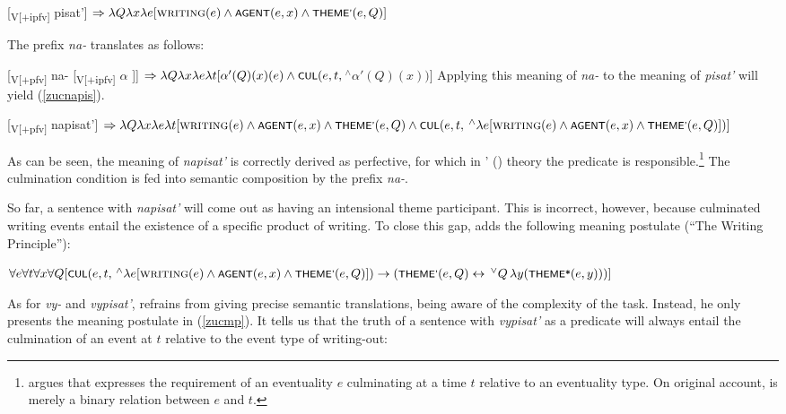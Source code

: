 \documentclass[output=paper,colorlinks,citecolor=brown]{langscibook}
\begin{document}
\ea
\label{zucpis} 
[\textsubscript{V[$+$ipfv]} pisat'] $\Rightarrow \lambda Q \lambda x \lambda e [\textsc{writing}(e) \wedge \cnst{agent}(e,x) \wedge \cnst{theme'}(e,Q)]$
\z

\noindent The prefix \textit{na-} translates as follows:

\ea
\label{zucna} 
[\textsubscript{V[$+$pfv]} na- [\textsubscript{V[$+$ipfv]} $\alpha$ ]] 
$\Rightarrow \lambda Q \lambda x \lambda e \lambda t [\alpha'(Q)(x)(e) \wedge \cnst{Cul}(e,t,{}$$^\wedge \alpha'(Q)(x))]$
\z
Applying this meaning of \textit{na-} to the meaning of \textit{pisat'} will yield (\ref{zucnapis}).

\ea
\label{zucnapis} 
[\textsubscript{V[$+$pfv]} napisat'] $\Rightarrow \lambda Q \lambda x \lambda e \lambda t [\textsc{writing}(e) \wedge \cnst{agent}(e,x) \wedge \cnst{theme'}(e,Q) \wedge \cnst{Cul}(e,t,{}$$^\wedge \lambda e [\textsc{writing} (e) \wedge \cnst{agent}(e,x) \wedge \cnst{theme'}(e,Q)])]$
\z

\noindent As can be seen, the meaning of \textit{napisat'} is correctly derived as perfective, for which in \citeauthor{Parsons1990}' (\citeyear{Parsons1990}) theory the predicate  is responsible.\footnote{\citet{Zucchi1999} argues that  expresses the requirement of an eventuality $e$ culminating at a time $t$ relative to an eventuality type. On  original account,  is merely a binary relation between $e$ and $t$.} The culmination condition is fed into semantic composition by the prefix \textit{na-}.  

So far, a sentence with \textit{napisat'} will come out as having an intensional theme participant. This is incorrect, however,  
because culminated writing events entail the existence of a specific product of writing. To close this gap, \citet{Zucchi1999} adds the following meaning postulate (``The Writing Principle''): 

\ea
\label{zucwp} 
$\forall e \forall t \forall x \forall Q [\cnst{Cul}(e,t, \,^\wedge \lambda e [\textsc{writing} (e) \wedge \cnst{agent}(e,x) \wedge \cnst{theme'}(e,Q)]) \rightarrow (\cnst{theme'}(e,Q) \leftrightarrow  \, ^\vee Q \,\lambda y(\cnst{theme*}(e,y)))]$
\z

\noindent As for \textit{vy-} and \textit{vypisat'},
\citet{Zucchi1999} refrains from giving precise semantic translations, being aware of the complexity of the task. Instead, he only presents the meaning postulate in (\ref{zucmp}). It tells us that the truth of a sentence with \textit{vypisat'} as 
a predicate will always entail the culmination of an event at $t$ relative to the event type of writing-out: 
\end{document}
